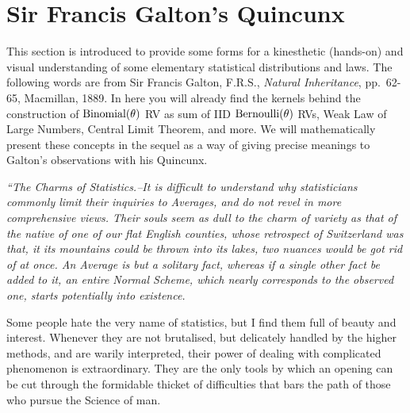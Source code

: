 \section{Sir Francis Galton's Quincunx}\label{S:Quincunx}
This section is introduced to provide some forms for a kinesthetic (hands-on) and visual understanding of some elementary statistical distributions and laws.  The following words are from Sir Francis Galton, F.R.S., {\em Natural Inheritance}, pp.~62-65, Macmillan, 1889.  In here you will already find the kernels behind the construction of $\mbox{{\rm Binomial}}(\theta)$ RV as sum of IID $\mbox{{\rm Bernoulli}}(\theta)$ RVs, Weak Law of Large Numbers, Central Limit Theorem, and more.  We will mathematically present these concepts in the sequel as a way of giving precise meanings to Galton's observations with his Quincunx.
{\it ``{\em The Charms of Statistics}.--It is difficult to understand why statisticians commonly limit their inquiries to Averages, and do not revel in more comprehensive views.  Their souls seem as dull to the charm of variety as that of the native of one of our flat English counties, whose retrospect of Switzerland was that, it its mountains could be thrown into its lakes, two nuances would be got rid of at once.  An Average is but a solitary fact, whereas if a single other fact be added to it, an entire Normal Scheme, which nearly corresponds to the observed one, starts potentially into existence.

Some people hate the very name of statistics, but I find them full of beauty and interest.  Whenever they are not brutalised, but delicately handled by the higher methods, and are warily interpreted, their power of dealing with complicated phenomenon is extraordinary.  They are the only tools by which an opening can be cut through the formidable thicket of difficulties that bars the path of those who pursue the Science of man.}

